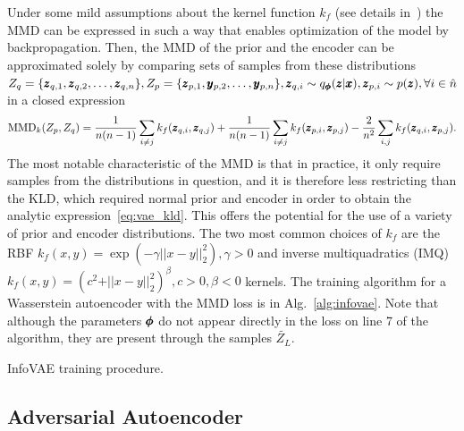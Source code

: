 Under some mild assumptions about the kernel function $k_f$ (see details in~\cite{tolstikhin2017wasserstein}) the MMD can be expressed in such a way that enables optimization of the model by backpropagation. Then, the MMD of the prior and the encoder can be approximated solely by comparing sets of samples from these  distributions $Z_q=\{\pmb{{z}}_{q,1}, \pmb{{z}}_{q,2}, \ldots, \pmb{{z}}_{q,n}\}, Z_p=\{\pmb{{z}}_{p,1}, \pmb{{y}}_{p,2}, \ldots, \pmb{{y}}_{p,n}\},\pmb{{z}}_{q,i}\sim q_{\pmb{{\phi}}}(\pmb{{z}}|\pmb{{x}}),\pmb{{z}}_{p,i} \sim p(\pmb{{z}}),\forall i \in \hat{n}$ in a closed expression
\begin{equation} \label{eq:mmd}
\text{MMD}_{k}(Z_p,Z_q)=\frac{1}{n(n-1)}\sum_{i\neq j}k_f(\pmb{{z}}_{q,i},\pmb{{z}}_{q,j})+\frac{1}{n(n-1)}\sum_{i\neq j}k_f(\pmb{{z}}_{p,i},\pmb{{z}}_{p,j})-\frac{2}{n^{2}}\sum_{i,j}k_f(\pmb{{z}}_{q,i}, \pmb{{z}}_{p,j}).
\end{equation}
The most notable characteristic of the MMD is that in practice, it only require samples from the distributions in question, and it is therefore less restricting than the KLD, which required normal prior and encoder in order to obtain the analytic expression~\eqref{eq:vae_kld}. This offers the potential for the use of a variety of prior and encoder distributions. The two most common choices of $k_f$ are the RBF $k_f(x,y) = \exp(- \gamma \vert \vert x - y \vert \vert_2^2), \gamma > 0$ and inverse multiquadratics (IMQ) $k_f(x,y) = (c^2 +  \vert \vert x - y \vert \vert_2^2)^\beta, c>0, \beta < 0$ kernels. The training algorithm for a Wasserstein autoencoder with the MMD loss is in Alg.~\ref{alg:infovae}. Note that although the parameters $\pmb{{\phi}}$ do not appear directly in the loss on line 7 of the algorithm, they are present through the samples $\tilde{Z_{L}}$. 

\begin{algorithm}


\caption{InfoVAE training procedure.}
\label{alg:infovae}
\end{algorithm}



\subsection{Adversarial Autoencoder}

